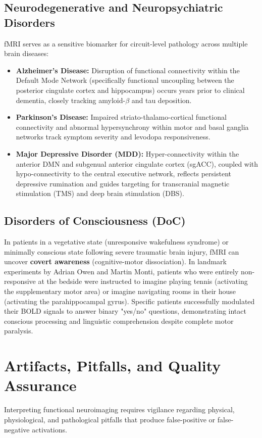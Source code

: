 \documentclass[11pt,a4paper]{article}
\begin{document}
\subsection{Neurodegenerative and Neuropsychiatric Disorders}
fMRI serves as a sensitive biomarker for circuit-level pathology across multiple brain diseases:
\begin{itemize}[leftmargin=2em]
    \item \textbf{Alzheimer's Disease:} Disruption of functional connectivity within the Default Mode Network (specifically functional uncoupling between the posterior cingulate cortex and hippocampus) occurs years prior to clinical dementia, closely tracking amyloid-$\beta$ and tau deposition.
    \item \textbf{Parkinson's Disease:} Impaired striato-thalamo-cortical functional connectivity and abnormal hypersynchrony within motor and basal ganglia networks track symptom severity and levodopa responsiveness.
    \item \textbf{Major Depressive Disorder (MDD):} Hyper-connectivity within the anterior DMN and subgenual anterior cingulate cortex (sgACC), coupled with hypo-connectivity to the central executive network, reflects persistent depressive rumination and guides targeting for transcranial magnetic stimulation (TMS) and deep brain stimulation (DBS).
\end{itemize}

\subsection{Disorders of Consciousness (DoC)}
In patients in a vegetative state (unresponsive wakefulness syndrome) or minimally conscious state following severe traumatic brain injury, fMRI can uncover \textbf{covert awareness} (cognitive-motor dissociation). In landmark experiments by Adrian Owen and Martin Monti, patients who were entirely non-responsive at the bedside were instructed to imagine playing tennis (activating the supplementary motor area) or imagine navigating rooms in their house (activating the parahippocampal gyrus). Specific patients successfully modulated their BOLD signals to answer binary "yes/no" questions, demonstrating intact conscious processing and linguistic comprehension despite complete motor paralysis.

\section{Artifacts, Pitfalls, and Quality Assurance}
Interpreting functional neuroimaging requires vigilance regarding physical, physiological, and pathological pitfalls that produce false-positive or false-negative activations.
\end{document}
